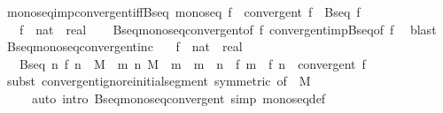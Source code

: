 \begin{isabellebody}
\isamarkupfalse%
\ monoseq{\isacharunderscore}{\kern0pt}imp{\isacharunderscore}{\kern0pt}convergent{\isacharunderscore}{\kern0pt}iff{\isacharunderscore}{\kern0pt}Bseq{\isacharcolon}{\kern0pt}\ {\isachardoublequoteopen}monoseq\ f\ {\isasymLongrightarrow}\ convergent\ f\ {\isasymlongleftrightarrow}\ Bseq\ f{\isachardoublequoteclose}\isanewline
\ \ \ f\ {\isacharcolon}{\kern0pt}{\isacharcolon}{\kern0pt}\ {\isachardoublequoteopen}nat\ {\isasymRightarrow}\ real{\isachardoublequoteclose}\isanewline
%
\isadelimproof
\ \ %
\endisadelimproof
%
\isatagproof
{}\isamarkupfalse%
\ Bseq{\isacharunderscore}{\kern0pt}monoseq{\isacharunderscore}{\kern0pt}convergent{\isacharbrackleft}{\kern0pt}of\ f{\isacharbrackright}{\kern0pt}\ convergent{\isacharunderscore}{\kern0pt}imp{\isacharunderscore}{\kern0pt}Bseq{\isacharbrackleft}{\kern0pt}of\ f{\isacharbrackright}{\kern0pt}\ \isamarkupfalse%
\ blast%
\endisatagproof
{\isafoldproof}%
%
\isadelimproof
\isanewline
%
\endisadelimproof
\isanewline
{}\isamarkupfalse%
\ Bseq{\isacharunderscore}{\kern0pt}monoseq{\isacharunderscore}{\kern0pt}convergent{\isacharprime}{\kern0pt}{\isacharunderscore}{\kern0pt}inc{\isacharcolon}{\kern0pt}\isanewline
\ \ \ f\ {\isacharcolon}{\kern0pt}{\isacharcolon}{\kern0pt}\ {\isachardoublequoteopen}nat\ {\isasymRightarrow}\ real{\isachardoublequoteclose}\isanewline
\ \ \ {\isachardoublequoteopen}Bseq\ {\isacharparenleft}{\kern0pt}{\isasymlambda}n{\isachardot}{\kern0pt}\ f\ {\isacharparenleft}{\kern0pt}n\ {\isacharplus}{\kern0pt}\ M{\isacharparenright}{\kern0pt}{\isacharparenright}{\kern0pt}\ {\isasymLongrightarrow}\ {\isacharparenleft}{\kern0pt}{\isasymAnd}m\ n{\isachardot}{\kern0pt}\ M\ {\isasymle}\ m\ {\isasymLongrightarrow}\ m\ {\isasymle}\ n\ {\isasymLongrightarrow}\ f\ m\ {\isasymle}\ f\ n{\isacharparenright}{\kern0pt}\ {\isasymLongrightarrow}\ convergent\ f{\isachardoublequoteclose}\isanewline
%
\isadelimproof
\ \ %
\endisadelimproof
%
\isatagproof
{}\isamarkupfalse%
\ {\isacharparenleft}{\kern0pt}subst\ convergent{\isacharunderscore}{\kern0pt}ignore{\isacharunderscore}{\kern0pt}initial{\isacharunderscore}{\kern0pt}segment\ {\isacharbrackleft}{\kern0pt}symmetric{\isacharcomma}{\kern0pt}\ of\ {\isacharunderscore}{\kern0pt}\ M{\isacharbrackright}{\kern0pt}{\isacharparenright}{\kern0pt}\isanewline
\ \ \ \ \ {\isacharparenleft}{\kern0pt}auto\ intro{\isacharbang}{\kern0pt}{\isacharcolon}{\kern0pt}\ Bseq{\isacharunderscore}{\kern0pt}monoseq{\isacharunderscore}{\kern0pt}convergent\ simp{\isacharcolon}{\kern0pt}\ monoseq{\isacharunderscore}{\kern0pt}def{\isacharparenright}{\kern0pt}%

\end{isabellebody}
